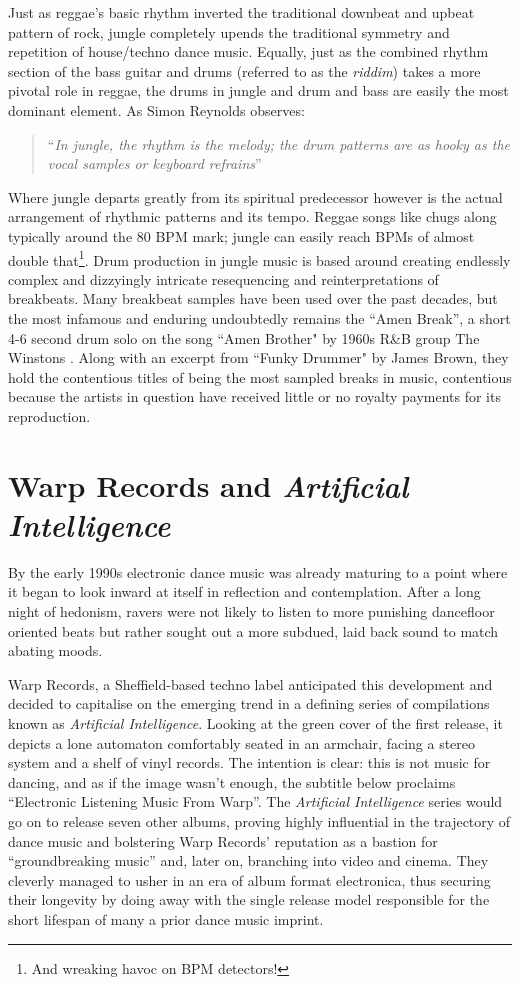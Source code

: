 Just as reggae’s basic rhythm inverted the traditional downbeat and upbeat pattern of rock, jungle completely upends the traditional symmetry and repetition of house/techno dance music. Equally, just as the combined rhythm section of the bass guitar and drums (referred to as the \textit{riddim}) takes a more pivotal role in reggae, the drums in jungle and drum and bass are easily the most dominant element. As Simon Reynolds observes:

\blockcquote[]{Reynolds2013}{``\textit{In jungle, the rhythm is the melody; the drum patterns are as hooky as the vocal samples or keyboard refrains}''}

Where jungle departs greatly from its spiritual predecessor however is the actual arrangement of rhythmic patterns and its tempo. Reggae songs like chugs along typically around the 80 BPM mark; jungle can easily reach BPMs of almost double that\footnote{And wreaking havoc on BPM detectors!}. Drum production in jungle music is based around creating endlessly complex and dizzyingly intricate resequencing and reinterpretations of breakbeats. Many breakbeat samples have been used over the past decades, but the most infamous and enduring undoubtedly remains the “Amen Break”, a short 4-6 second drum solo on the song ``Amen Brother" by 1960s R\&B group The Winstons \citep{Collins2007a}. Along with an excerpt from ``Funky Drummer" by James Brown, they hold the contentious titles of being the most sampled breaks in music, contentious because the artists in question have received little or no royalty payments for its reproduction.

\section{Warp Records and \textit{Artificial Intelligence}}

By the early 1990s electronic dance music was already maturing to a point where it began to look inward at itself in reflection and contemplation. After a long night of hedonism, ravers were not likely to listen to more punishing dancefloor oriented beats but rather sought out a more subdued, laid back sound to match abating moods.

Warp Records, a Sheffield-based techno label anticipated this development and decided to capitalise on the emerging trend in a defining series of compilations known as \textit{Artificial Intelligence}. Looking at the green cover of the first release, it depicts a lone automaton comfortably seated in an armchair, facing a stereo system and a shelf of vinyl records. The intention is clear: this is not music for dancing, and as if the image wasn’t enough, the subtitle below proclaims “Electronic Listening Music From Warp”. The \textit{Artificial Intelligence} series would go on to release seven other albums, proving highly influential in the trajectory of dance music and bolstering Warp Records’ reputation as a bastion for “groundbreaking music” and, later on, branching into video and cinema. They cleverly managed to usher in an era of album format electronica, thus securing their longevity by doing away with the single release model responsible for the short lifespan of many a prior dance music imprint.

